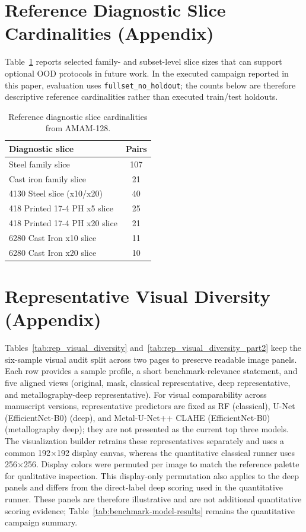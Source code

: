 \documentclass{article}
\newcommand{\datasetname}{AMAM-128}
\newcommand{\tablefontsize}{\small}
\begin{document}
\section{Reference Diagnostic Slice Cardinalities (Appendix)}\label{app:ood}
Table~\ref{tab:oodsplits} reports selected family- and subset-level slice sizes
that can support optional OOD protocols in future work. In the executed
campaign reported in this paper, evaluation uses
\texttt{fullset\_no\_holdout}; the counts below are therefore descriptive
reference cardinalities rather than executed train/test holdouts.
\begin{table}[ht]
    \centering
    \tablefontsize
    \caption{Reference diagnostic slice cardinalities from \datasetname{}.}
    \label{tab:oodsplits}
    \begin{tabular}{lc}
        \toprule
        Diagnostic slice & Pairs \\
        \midrule
        Steel family slice & 107 \\
        Cast iron family slice & 21 \\
        4130 Steel slice (x10/x20) & 40 \\
        418 Printed 17-4 PH x5 slice & 25 \\
        418 Printed 17-4 PH x20 slice & 21 \\
        6280 Cast Iron x10 slice & 11 \\
        6280 Cast Iron x20 slice & 10 \\
        \bottomrule
    \end{tabular}
\end{table}

\section{Representative Visual Diversity (Appendix)}\label{app:visual}
Tables~\ref{tab:rep_visual_diversity} and~\ref{tab:rep_visual_diversity_part2}
keep the six-sample visual audit split across two pages to preserve readable
image panels. Each row provides a sample profile, a short benchmark-relevance
statement, and five aligned views (original, mask, classical representative,
deep representative, and metallography-deep representative). For visual
comparability across manuscript versions, representative predictors are fixed
as RF (classical), U-Net (EfficientNet-B0) (deep), and Metal-U-Net++ CLAHE
(EfficientNet-B0) (metallography deep); they are not presented as the current
top three models. The visualization builder retrains these representatives
separately and uses a common 192$\times$192 display canvas, whereas the
quantitative classical runner uses 256$\times$256. Display colors were permuted
per image to match the reference palette for qualitative inspection. This
display-only permutation also applies to the deep panels and differs from the
direct-label deep scoring used in the quantitative runner. These panels are
therefore illustrative and are not
additional quantitative scoring evidence;
Table~\ref{tab:benchmark-model-results} remains the quantitative campaign
summary.
\end{document}
